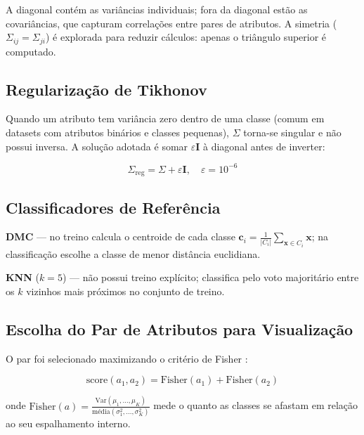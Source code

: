 \documentclass[12pt, a4paper]{article}
\begin{document}
A diagonal contém as variâncias individuais; fora da diagonal estão
as covariâncias, que capturam correlações entre pares de atributos.
A simetria ($\Sigma_{ij}=\Sigma_{ji}$) é explorada para reduzir
cálculos: apenas o triângulo superior é computado.

\subsection{Regularização de Tikhonov}

Quando um atributo tem variância zero dentro de uma classe (comum em
datasets com atributos binários e classes pequenas), $\Sigma$ torna-se
singular e não possui inversa. A solução adotada é somar
$\varepsilon\mathbf{I}$ à diagonal antes de inverter:

\begin{equation}
    \Sigma_{\text{reg}} = \Sigma + \varepsilon\mathbf{I},\quad
    \varepsilon = 10^{-6}
\end{equation}

\subsection{Classificadores de Referência}

\textbf{DMC} — no treino calcula o centroide de cada classe
$\boldsymbol{c}_i = \frac{1}{|C_i|}\sum_{\mathbf{x}\in C_i}\mathbf{x}$;
na classificação escolhe a classe de menor distância euclidiana.

\textbf{KNN} ($k=5$) — não possui treino explícito; classifica pelo
voto majoritário entre os $k$ vizinhos mais próximos no conjunto de
treino.

\subsection{Escolha do Par de Atributos para Visualização}

O par foi selecionado maximizando o critério de Fisher :

\begin{equation}
    \text{score}(a_1,a_2) =
    \text{Fisher}(a_1)+\text{Fisher}(a_2)
\end{equation}

\noindent onde $\text{Fisher}(a) = \frac{\text{Var}(\mu_1,\ldots,\mu_K)}
{\text{média}(\sigma^2_1,\ldots,\sigma^2_K)}$ mede o quanto as classes
se afastam em relação ao seu espalhamento interno.

\end{document}
